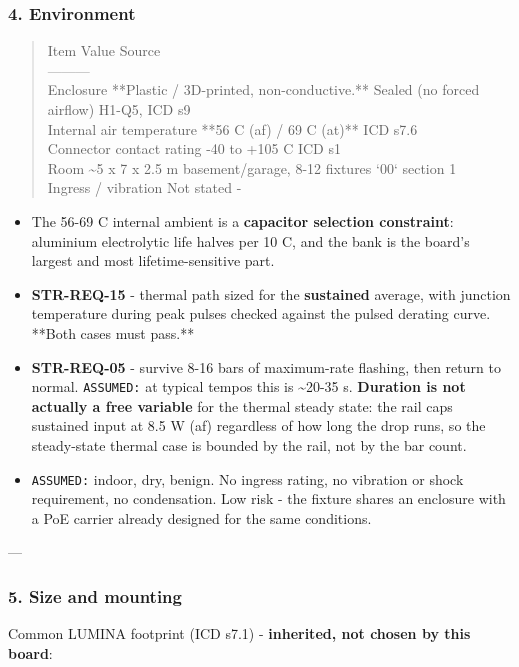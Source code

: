 \documentclass[11pt,a4paper]{article}
\begin{document}
\subsubsection*{4. Environment}
\begin{quote}\small\ttfamily\raggedright
\textbar{} Item \textbar{} Value \textbar{} Source \textbar{}\\
\textbar{}---\textbar{}---\textbar{}---\textbar{}\\
\textbar{} Enclosure \textbar{} {*}{*}Plastic / 3D-printed, non-conductive.{*}{*} Sealed (no forced airflow) \textbar{} H1-Q5, ICD s9 \textbar{}\\
\textbar{} Internal air temperature \textbar{} {*}{*}56 C (af) / 69 C (at){*}{*} \textbar{} ICD s7.6 \textbar{}\\
\textbar{} Connector contact rating \textbar{} -40 to +105 C \textbar{} ICD s1 \textbar{}\\
\textbar{} Room \textbar{} \textasciitilde{}5 x 7 x 2.5 m basement/garage, 8-12 fixtures \textbar{} `00` section 1 \textbar{}\\
\textbar{} Ingress / vibration \textbar{} Not stated \textbar{} - \textbar{}
\end{quote}
\begin{itemize}
\item The 56-69 C internal ambient is a \textbf{capacitor selection constraint}: aluminium
electrolytic life halves per 10 C, and the bank is the board's largest and most
lifetime-sensitive part.
\item \textbf{STR-REQ-15} - thermal path sized for the \textbf{sustained} average, with junction
temperature during peak pulses checked against the pulsed derating curve. {*}{*}Both cases must
pass.{*}{*}
\item \textbf{STR-REQ-05} - survive 8-16 bars of maximum-rate flashing, then return to normal.
\texttt{ASSUMED:} at typical tempos this is \textasciitilde{}20-35 s. \textbf{Duration is not actually a free variable}
for the thermal steady state: the rail caps sustained input at 8.5 W (af) regardless of how
long the drop runs, so the steady-state thermal case is bounded by the rail, not by the
bar count.
\item \texttt{ASSUMED:} indoor, dry, benign. No ingress rating, no vibration or shock requirement, no
condensation. Low risk - the fixture shares an enclosure with a PoE carrier already
designed for the same conditions.
\end{itemize}
---

\subsubsection*{5. Size and mounting}
Common LUMINA footprint (ICD s7.1) - \textbf{inherited, not chosen by this board}:
\end{document}
